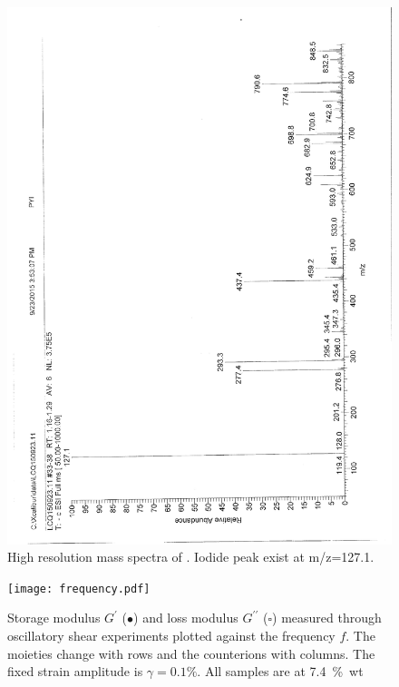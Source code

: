 \documentclass[journal=jacsat,manuscript=article]{achemso}
\begin{document}
\begin{figure}
\includegraphics[height=\textheight-2\baselineskip]{mass_PPyI.png}
\caption{High resolution mass spectra of . Iodide peak exist at m/z=127.1.}
\label{fig:massPPyI}
\end{figure}

\begin{figure}
\texttt{[image: frequency.pdf]}
\caption{Storage modulus $G^\prime$ ($\bullet$) and loss modulus $G^{\prime\prime}$ ($\square$) measured through oscillatory shear experiments plotted against the frequency $f$. The moieties change with rows and the counterions with columns. The fixed strain amplitude is $\gamma=0.1\%$. All samples are at 7.4~\%~wt }
\label{fig:frequency}
\end{figure}
\end{document}
